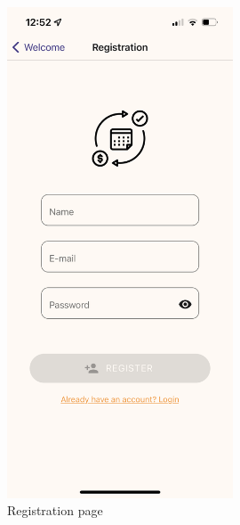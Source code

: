 \documentclass[12pt]{article}
\begin{document}
\begin{figure}[h!]
\begin{minipage}[c]{0.45\textwidth}
        \includegraphics[width=0.6\textwidth, clip]{../../assets/smartphone/reg.PNG}
        \caption{Registration page}
        \label{fig:reg}
    \end{minipage}
\end{figure}
\end{document}
